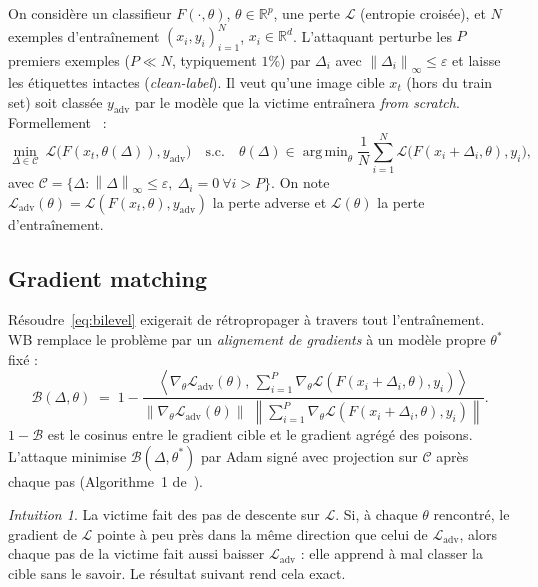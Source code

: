 \documentclass[11pt,a4paper]{article}
\theoremstyle{plain}
\theoremstyle{definition}
\theoremstyle{remark}
\newtheorem{intuition}[theorem]{Intuition}
\newcommand{\R}{\mathbb{R}}
\newcommand{\Loss}{\mathcal{L}}
\newcommand{\Ladv}{\mathcal{L}_{\mathrm{adv}}}
\newcommand{\B}{\mathcal{B}}
\newcommand{\norm}[1]{\left\lVert #1 \right\rVert}
\newcommand{\inner}[2]{\left\langle #1,\, #2 \right\rangle}
\newcommand{\yadv}{y_{\mathrm{adv}}}
\newcommand{\xt}{x_t}
\newcommand{\grad}{\nabla}
\DeclareMathOperator{\argmin}{arg\,min}
\begin{document}
On considère un classifieur $F(\cdot,\theta)$, $\theta\in\R^p$, une perte $\Loss$ (entropie
croisée), et $N$ exemples d'entraînement $(x_i,y_i)_{i=1}^N$, $x_i\in\R^d$. L'attaquant perturbe
les $P$ premiers exemples ($P\ll N$, typiquement $1\%$) par $\Delta_i$ avec
$\norm{\Delta_i}_\infty\le\varepsilon$ et laisse les étiquettes intactes (\emph{clean-label}).
Il veut qu'une image cible $\xt$ (hors du train set) soit classée $\yadv$ par le modèle que la
victime entraînera \emph{from scratch}. Formellement~\cite[éq.~1]{geiping2021} :
\begin{equation}\label{eq:bilevel}
\min_{\Delta\in\mathcal{C}}\ \Loss\big(F(\xt,\theta(\Delta)),\yadv\big)
\quad\text{s.c.}\quad
\theta(\Delta)\in\argmin_\theta \frac1N\sum_{i=1}^N \Loss\big(F(x_i+\Delta_i,\theta),y_i\big),
\end{equation}
avec $\mathcal{C}=\{\Delta : \norm{\Delta}_\infty\le\varepsilon,\ \Delta_i=0\ \forall i>P\}$.
On note $\Ladv(\theta)=\Loss(F(\xt,\theta),\yadv)$ la perte adverse et $\Loss(\theta)$ la perte
d'entraînement.

\subsection{Gradient matching}

Résoudre~\eqref{eq:bilevel} exigerait de rétropropager à travers tout l'entraînement. WB remplace
le problème par un \emph{alignement de gradients} à un modèle propre $\theta^*$ fixé
\cite[éq.~3]{geiping2021} :
\begin{equation}\label{eq:B}
\B(\Delta,\theta)\;=\;1-\frac{\inner{\grad_\theta\Ladv(\theta)}{\sum_{i=1}^P\grad_\theta\Loss(F(x_i+\Delta_i,\theta),y_i)}}
{\norm{\grad_\theta\Ladv(\theta)}\;\norm{\sum_{i=1}^P\grad_\theta\Loss(F(x_i+\Delta_i,\theta),y_i)}}.
\end{equation}
$1-\B$ est le cosinus entre le gradient cible et le gradient agrégé des poisons. L'attaque minimise
$\B(\Delta,\theta^*)$ par Adam signé avec projection sur $\mathcal{C}$ après chaque pas
(Algorithme~1 de~\cite{geiping2021}).

\begin{intuition}
La victime fait des pas de descente sur $\Loss$. Si, à chaque $\theta$ rencontré, le gradient de
$\Loss$ pointe à peu près dans la même direction que celui de $\Ladv$, alors chaque pas de la
victime fait aussi baisser $\Ladv$ : elle apprend à mal classer la cible sans le savoir. Le
résultat suivant rend cela exact.
\end{intuition}
\end{document}
